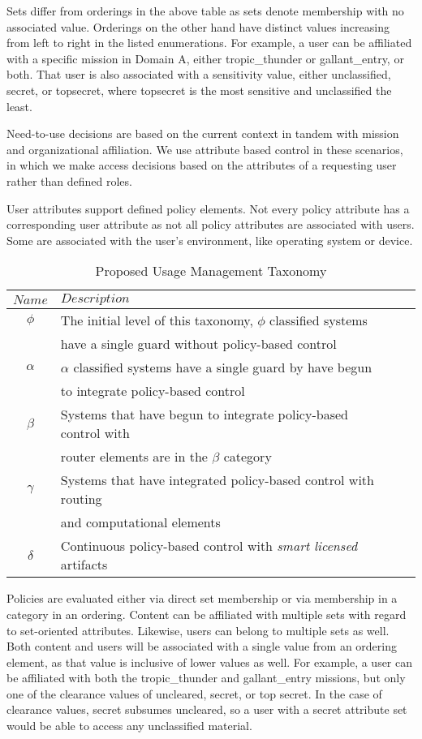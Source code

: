 Sets differ from orderings in the above table as sets denote membership with no associated value.  Orderings on the other hand have distinct values increasing from left to right in the listed enumerations.  For example, a user can be affiliated with a specific mission in Domain A, either tropic\_thunder or gallant\_entry, or both.  That user is also associated with a sensitivity value, either unclassified, secret, or topsecret, where topsecret is the most sensitive and unclassified the least.

Need-to-use decisions are based on the current context in tandem with mission and organizational affiliation.  We use attribute based control in these scenarios, in which we make access decisions based on the attributes of a requesting user rather than defined roles.

User attributes support defined policy elements.  Not every policy attribute has a corresponding user attribute as not all policy attributes are associated with users.  Some are associated with the user's environment, like operating system or device.

\begin{table*}[tp] %
\centering %
\begin{tabular}{clcc}
\toprule %
$ Name$ 	& $Description$ \\\toprule %
$\phi$ 		& The initial level of this taxonomy, $\phi$ classified systems \\
 			& have a single guard without policy-based control \\\midrule
$\alpha$	& $\alpha$ classified systems have a single guard by have begun \\
			& to integrate policy-based control \\\midrule
$\beta$		& Systems that have begun to integrate policy-based control with \\
			& router elements are in the $\beta$ category \\\midrule
$\gamma$	& Systems that have integrated policy-based control with routing \\
			& and computational elements \\\midrule
$\delta$	& Continuous policy-based control with \textit{smart licensed} artifacts \\\bottomrule
\end{tabular}
\caption{Proposed Usage Management Taxonomy}
\label{table:model:taxonomy}
\end{table*}

Policies are evaluated either via direct set membership or via membership in a category in an ordering.  Content can be affiliated with multiple sets with regard to set-oriented attributes.  Likewise, users can belong to multiple sets as well.  Both content and users will be associated with a single value from an ordering element, as that value is inclusive of lower values as well.  For example, a user can be affiliated with both the tropic\_thunder and gallant\_entry missions, but only one of the clearance values of uncleared, secret, or top secret.  In the case of clearance values, secret subsumes uncleared, so a user with a secret attribute set would be able to access any unclassified material.

